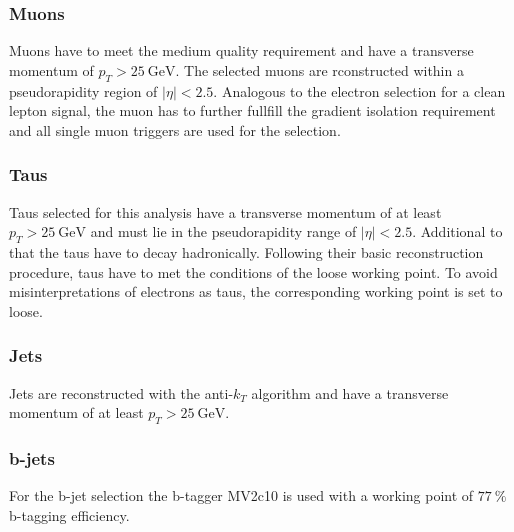 \subsubsection*{Muons}
Muons have to meet the medium quality requirement and have a transverse momentum of $p_T>\SI{25}{\giga\electronvolt}$. The selected muons are rconstructed within a pseudorapidity region of $|\eta|<2.5$. Analogous to the electron selection for a clean lepton signal, the muon has to further fullfill the gradient isolation requirement and all single muon triggers are used for the selection.
\subsubsection*{Taus}
Taus selected for this analysis have a transverse momentum of at least $p_T>\SI{25}{\giga\electronvolt}$ and must lie in the pseudorapidity range of $|\eta|<2.5$. Additional to that the taus have to decay hadronically. Following their basic reconstruction procedure, taus have to met the conditions of the loose working point. To avoid misinterpretations of electrons as taus, the corresponding working point is set to loose.
\subsubsection*{Jets}
Jets are reconstructed with the anti-$k_T$ algorithm and have a transverse momentum of at least $p_T>\SI{25}{\giga\electronvolt}$. 
\subsubsection*{b-jets}
For the b-jet selection the b-tagger MV2c10 is used with a working point of $\SI{77}{\percent}$ b-tagging efficiency.
